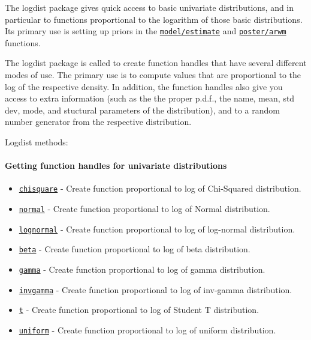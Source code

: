

	The logdist package gives quick access to basic univariate
distributions, and in particular to functions proportional to the
logarithm of those basic distributions. Its primary use is setting up
priors in the \href{model/estimate}{\texttt{model/estimate}} and
\href{poster/arwm}{\texttt{poster/arwm}} functions.

The logdist package is called to create function handles that have
several different modes of use. The primary use is to compute values
that are proportional to the log of the respective density. In addition,
the function handles also give you access to extra information (such as
the the proper p.d.f., the name, mean, std dev, mode, and stuctural
parameters of the distribution), and to a random number generator from
the respective distribution.

Logdist methods:

\paragraph{Getting function handles for univariate
distributions}

\begin{itemize}
\itemsep1pt\parskip0pt
\item
  \href{logdist/chisquare}{\texttt{chisquare}} - Create function
  proportional to log of Chi-Squared distribution.
\item
  \href{logdist/normal}{\texttt{normal}} - Create function proportional
  to log of Normal distribution.
\item
  \href{logdist/lognormal}{\texttt{lognormal}} - Create function
  proportional to log of log-normal distribution.
\item
  \href{logdist/beta}{\texttt{beta}} - Create function proportional to
  log of beta distribution.
\item
  \href{logdist/gamma}{\texttt{gamma}} - Create function proportional to
  log of gamma distribution.
\item
  \href{logdist/invgamma}{\texttt{invgamma}} - Create function
  proportional to log of inv-gamma distribution.
\item
  \href{logdist/t}{\texttt{t}} - Create function proportional to log of
  Student T distribution.
\item
  \href{logdist/uniform}{\texttt{uniform}} - Create function
  proportional to log of uniform distribution.
\end{itemize}

